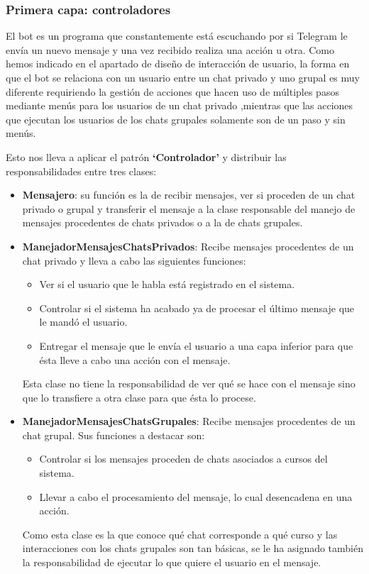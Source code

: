 \subsubsection{Primera capa: controladores}

El bot es un programa que constantemente está escuchando por si Telegram le envía un nuevo mensaje y una vez recibido realiza una acción u otra.
Como hemos indicado en el apartado de diseño de interacción de usuario, la forma en que el bot se relaciona con un usuario entre un chat privado y uno grupal es muy diferente requiriendo la gestión de acciones que hacen uso de múltiples pasos mediante  menús para los usuarios de un chat privado ,mientras que las acciones que ejecutan los usuarios de los chats grupales solamente son de un paso y sin menús.

Esto nos lleva a aplicar el patrón \textbf{\enquote*{Controlador}} y distribuir las responsabilidades entre tres clases:
\begin{itemize}
\item \textbf{Mensajero}: su función es la de recibir mensajes, ver si proceden de un chat privado o grupal y transferir el mensaje a la clase responsable del manejo de mensajes procedentes de chats privados o a la de chats grupales.
\item \textbf{ManejadorMensajesChatsPrivados}: Recibe mensajes procedentes de un chat privado y lleva a cabo las siguientes funciones:
\begin{itemize}
\item Ver si el usuario que le habla está registrado en el sistema.
\item Controlar si el sistema ha acabado ya de procesar el último mensaje que le mandó el usuario.
\item Entregar el mensaje que le envía el usuario a una capa inferior para que ésta lleve a cabo una acción con el mensaje.
\end{itemize}
Esta clase no tiene la responsabilidad de ver qué se hace con el mensaje sino que lo transfiere a otra clase para que ésta lo procese.
\item \textbf{ManejadorMensajesChatsGrupales}: Recibe mensajes procedentes de un chat grupal. Sus funciones a destacar son:
\begin{itemize}
\item Controlar si los mensajes proceden de chats asociados a cursos del sistema.
\item Llevar a cabo el procesamiento del mensaje, lo cual desencadena en una acción.
\end{itemize}
Como  esta clase es la que conoce qué chat corresponde a qué curso y las interacciones con los chats grupales son tan básicas, se le ha asignado también la responsabilidad de ejecutar lo que quiere el usuario en el mensaje.
\end{itemize}

